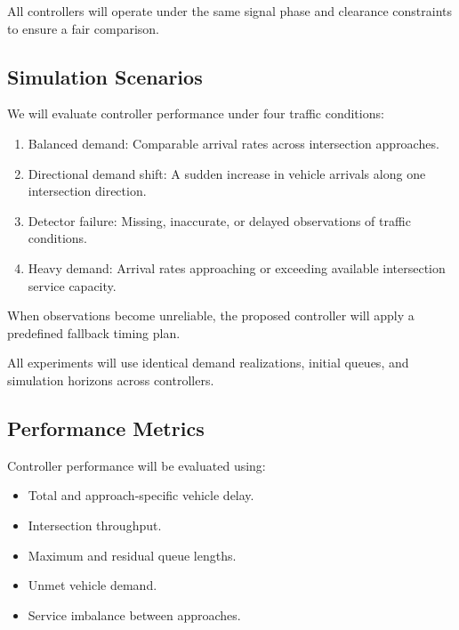 \documentclass[letterpaper,12pt,conference]{ieeeconf}
\begin{document}
All controllers will operate under the same signal
phase and clearance constraints to ensure a fair
comparison.

\subsection{Simulation Scenarios}

We will evaluate controller performance under four
traffic conditions:

\begin{enumerate}

    \item Balanced demand:
    Comparable arrival rates across intersection
    approaches.

    \item Directional demand shift:
    A sudden increase in vehicle arrivals along
    one intersection direction.

    \item Detector failure:
    Missing, inaccurate, or delayed observations
    of traffic conditions.

    \item Heavy demand:
    Arrival rates approaching or exceeding
    available intersection service capacity.

\end{enumerate}

When observations become unreliable, the proposed
controller will apply a predefined fallback timing plan.

All experiments will use identical demand realizations,
initial queues, and simulation horizons across controllers.

\subsection{Performance Metrics}

Controller performance will be evaluated using:

\begin{itemize}
    \item Total and approach-specific vehicle delay.
    \item Intersection throughput.
    \item Maximum and residual queue lengths.
    \item Unmet vehicle demand.
    \item Service imbalance between approaches.
\end{itemize}
\end{document}

